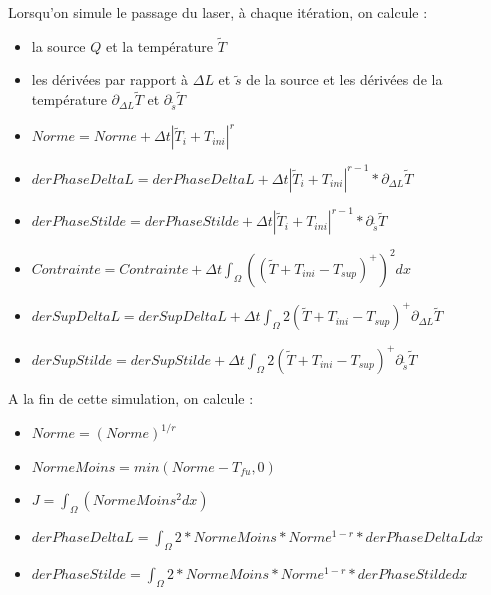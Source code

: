 \documentclass[11pt,a4paper]{article}
\begin{document}
Lorsqu'on simule le passage du laser, à chaque itération, on calcule :
\begin{itemize}
	\item la source $Q$ et la température $\tilde{T}$
	\item les dérivées par rapport à $\Delta L$ et $\tilde{s}$ de la source et les dérivées de la température $\partial_{\Delta L}\tilde{T}$ et $\partial_{\tilde{s}}\tilde{T}$
	\item $Norme=Norme+\Delta t |\tilde{T}_i+T_{ini}|^r$
		\item $derPhaseDeltaL=derPhaseDeltaL+\Delta t |\tilde{T}_i+T_{ini}|^{r-1}*\partial_{\Delta L}\tilde{T}$
		\item $derPhaseStilde=derPhaseStilde+\Delta t |\tilde{T}_i+T_{ini}|^{r-1}*\partial_{\tilde{s}}\tilde{T}$	
		\item $Contrainte=Contrainte+\Delta t \int_{\Omega}\left(\left(\tilde{T}+T_{ini}-T_{sup}\right)^+\right)^2dx$
		\item $derSupDeltaL=derSupDeltaL+\Delta t \int_{\Omega}2\left(\tilde{T}+T_{ini}-T_{sup}\right)^+\partial_{\Delta L}\tilde{T}$
		\item $derSupStilde=derSupStilde+\Delta t \int_{\Omega}2\left(\tilde{T}+T_{ini}-T_{sup}\right)^+\partial_{\tilde{s}}\tilde{T}$
\end{itemize}

A la fin de cette simulation, on calcule :

\begin{itemize}
	\item $Norme=(Norme)^{1/r}$
	\item $NormeMoins=min(Norme-T_{fu},0) $
	\item $J=\int_{\Omega}(NormeMoins^2dx)$
	\item $derPhaseDeltaL=\int_{\Omega}2*NormeMoins*Norme^{1-r}*derPhaseDeltaLdx$
	\item $derPhaseStilde=\int_{\Omega}2*NormeMoins*Norme^{1-r}*derPhaseStildedx$
\end{itemize}
\end{document}
